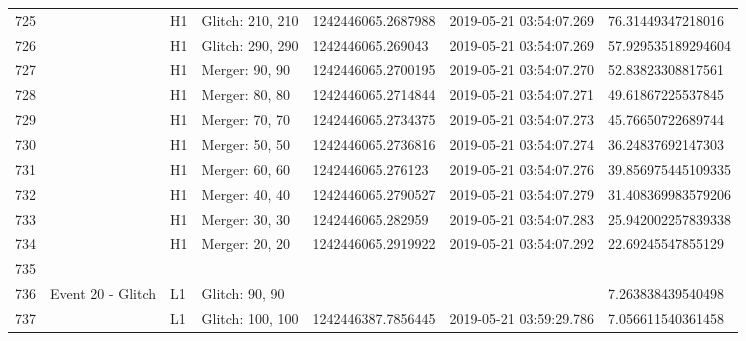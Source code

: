 \begin{longtable}{lllllll}
725  &                                                    &       H1 &  Glitch: 210, 210 &  1242446065.2687988 &  2019-05-21 03:54:07.269 &   76.31449347218016 \\
726  &                                                    &       H1 &  Glitch: 290, 290 &   1242446065.269043 &  2019-05-21 03:54:07.269 &  57.929535189294604 \\
727  &                                                    &       H1 &    Merger: 90, 90 &  1242446065.2700195 &  2019-05-21 03:54:07.270 &   52.83823308817561 \\
728  &                                                    &       H1 &    Merger: 80, 80 &  1242446065.2714844 &  2019-05-21 03:54:07.271 &   49.61867225537845 \\
729  &                                                    &       H1 &    Merger: 70, 70 &  1242446065.2734375 &  2019-05-21 03:54:07.273 &   45.76650722689744 \\
730  &                                                    &       H1 &    Merger: 50, 50 &  1242446065.2736816 &  2019-05-21 03:54:07.274 &   36.24837692147303 \\
731  &                                                    &       H1 &    Merger: 60, 60 &   1242446065.276123 &  2019-05-21 03:54:07.276 &  39.856975445109335 \\
732  &                                                    &       H1 &    Merger: 40, 40 &  1242446065.2790527 &  2019-05-21 03:54:07.279 &  31.408369983579206 \\
733  &                                                    &       H1 &    Merger: 30, 30 &   1242446065.282959 &  2019-05-21 03:54:07.283 &  25.942002257839338 \\
734  &                                                    &       H1 &    Merger: 20, 20 &  1242446065.2919922 &  2019-05-21 03:54:07.292 &   22.69245547855129 \\
735  &                                                    &          &                   &                     &                          &                     \\
736  &                                  Event 20 - Glitch &       L1 &    Glitch: 90, 90 &                     &                          &   7.263838439540498 \\
737  &                                                    &       L1 &  Glitch: 100, 100 &  1242446387.7856445 &  2019-05-21 03:59:29.786 &   7.056611540361458 \\

\end{longtable}
